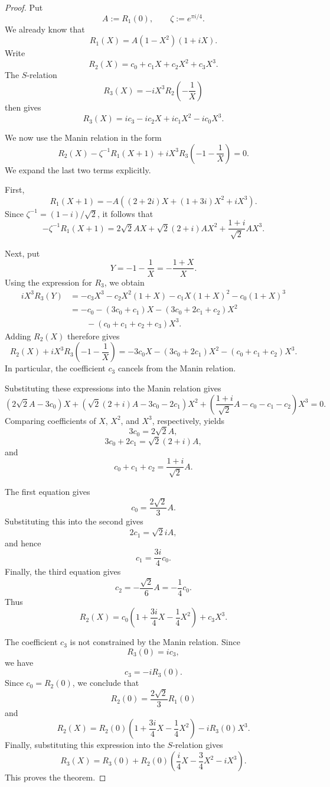 \documentclass[preprint,12pt]{elsarticle}
\theoremstyle{definition}
\theoremstyle{remark}
\begin{document}
\begin{proof}
	Put
	\[
	A:=R_1(0),\qquad \zeta:=e^{\pi i/4}.
	\]
	We already know that
	\[
	R_1(X)=A(1-X^2)(1+iX).
	\]
	Write
	\[
	R_2(X)=c_0+c_1X+c_2X^2+c_3X^3.
	\]
	The $S$-relation
	\[
	R_3(X)=-iX^3R_2\left(-\frac{1}{X}\right)
	\]
	then gives
	\[
	R_3(X)=ic_3-ic_2X+ic_1X^2-ic_0X^3.
	\]
	
	We now use the Manin relation in the form
	\[
	R_2(X)-\zeta^{-1}R_1(X+1)+iX^3R_3\left(-1-\frac{1}{X}\right)=0.
	\]
	We expand the last two terms explicitly.
	
	First,
	\[
	R_1(X+1)=-A\left((2+2i)X+(1+3i)X^2+iX^3\right).
	\]
	Since $\zeta^{-1}=(1-i)/\sqrt{2}$, it follows that
	\[
	-\zeta^{-1}R_1(X+1)=2\sqrt{2}AX+\sqrt{2}(2+i)AX^2+\frac{1+i}{\sqrt{2}}AX^3.
	\]
	
	Next, put
	\[
	Y=-1-\frac{1}{X}=-\frac{1+X}{X}.
	\]
	Using the expression for $R_3$, we obtain
	\begin{align*}
		iX^3R_3(Y)
		&=-c_3X^3-c_2X^2(1+X)-c_1X(1+X)^2-c_0(1+X)^3\\
		&=-c_0-(3c_0+c_1)X-(3c_0+2c_1+c_2)X^2\\
		&\qquad -(c_0+c_1+c_2+c_3)X^3.
	\end{align*}
	Adding $R_2(X)$ therefore gives
	\[
	R_2(X)+iX^3R_3\left(-1-\frac{1}{X}\right)
	=-3c_0X-(3c_0+2c_1)X^2-(c_0+c_1+c_2)X^3.
	\]
	In particular, the coefficient $c_3$ cancels from the Manin relation.
	
	Substituting these expressions into the Manin relation gives
	\[
	\left(2\sqrt{2}A-3c_0\right)X
	+\left(\sqrt{2}(2+i)A-3c_0-2c_1\right)X^2
	+\left(\frac{1+i}{\sqrt{2}}A-c_0-c_1-c_2\right)X^3=0.
	\]
	Comparing coefficients of $X$, $X^2$, and $X^3$, respectively, yields
	\[
	3c_0=2\sqrt{2}A,
	\]
	\[
	3c_0+2c_1=\sqrt{2}(2+i)A,
	\]
	and
	\[
	c_0+c_1+c_2=\frac{1+i}{\sqrt{2}}A.
	\]
	
	The first equation gives
	\[
	c_0=\frac{2\sqrt{2}}{3}A.
	\]
	Substituting this into the second gives
	\[
	2c_1=\sqrt{2}iA,
	\]
	and hence
	\[
	c_1=\frac{3i}{4}c_0.
	\]
	Finally, the third equation gives
	\[
	c_2=-\frac{\sqrt{2}}{6}A=-\frac{1}{4}c_0.
	\]
	Thus
	\[
	R_2(X)=c_0\left(1+\frac{3i}{4}X-\frac{1}{4}X^2\right)+c_3X^3.
	\]
	
	The coefficient $c_3$ is not constrained by the Manin relation.  Since
	\[
	R_3(0)=ic_3,
	\]
	we have
	\[
	c_3=-iR_3(0).
	\]
	Since $c_0=R_2(0)$, we conclude that
	\[
	R_2(0)=\frac{2\sqrt{2}}{3}R_1(0)
	\]
	and
	\[
	R_2(X)=R_2(0)\left(1+\frac{3i}{4}X-\frac{1}{4}X^2\right)-iR_3(0)X^3.
	\]
	Finally, substituting this expression into the $S$-relation gives
	\[
	R_3(X)=R_3(0)+R_2(0)\left(\frac{i}{4}X-\frac{3}{4}X^2-iX^3\right).
	\]
	This proves the theorem.
\end{proof}
\end{document}
